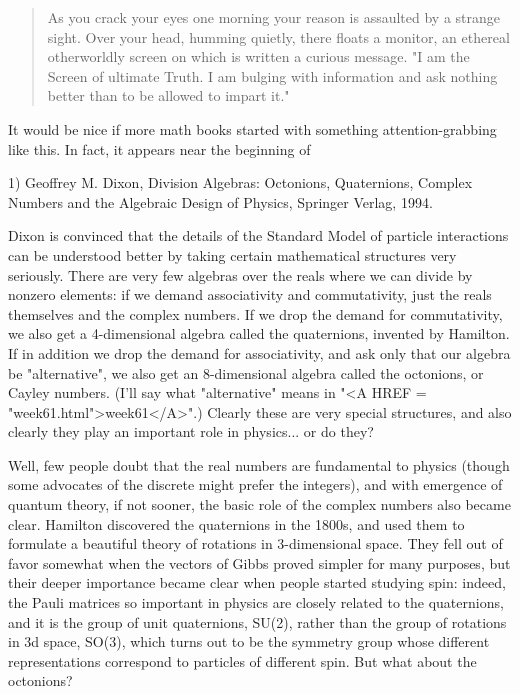 

\begin{quote}
   As you crack your eyes one morning your reason is assaulted by
   a strange sight.  Over your head, humming quietly, there floats
   a monitor, an ethereal otherworldly screen on which is written a
   curious message.  "I am the Screen of ultimate Truth.  I am bulging
   with information and ask nothing better than to be allowed to impart
   it."
\end{quote}

It would be nice if more math books started with something
attention-grabbing like this.  In fact, it appears near the beginning
of

1) Geoffrey M. Dixon, Division Algebras: Octonions, Quaternions,
Complex Numbers and the Algebraic Design of Physics, Springer Verlag,
1994.


Dixon is convinced that the details of the Standard Model of particle
interactions can be understood better by taking certain mathematical
structures very seriously.  There are very few algebras over the reals
where we can divide by nonzero elements: if we demand associativity
and commutativity, just the reals themselves and the complex numbers.
If we drop the demand for commutativity, we also get a 4-dimensional
algebra called the quaternions, invented by Hamilton.  If in addition
we drop the demand for associativity, and ask only that our algebra be
"alternative", we also get an 8-dimensional algebra called the
octonions, or Cayley numbers.  (I'll say what "alternative" means in
"<A HREF = "week61.html">week61</A>".)  Clearly these are very special
structures, and also clearly they play an important role in
physics... or do they?

Well, few people doubt that the real numbers are fundamental 
to physics (though some advocates of the discrete 
might prefer the integers), and with emergence of quantum 
theory, if not sooner, the basic role of the complex 
numbers also became clear.  Hamilton discovered the quaternions
in the 1800s, and used them to formulate
a beautiful theory of rotations in 3-dimensional space.  They
fell out of favor somewhat when the vectors of Gibbs proved
simpler for many purposes, but their deeper importance became
clear when people started studying spin: indeed,
the Pauli matrices so important in physics are closely related
to the quaternions, and it is the group of unit quaternions, SU(2), 
rather than the group of rotations in 3d space, SO(3), which
turns out to be the symmetry group whose different representations 
correspond to particles of different spin.  But what about the
octonions?  

